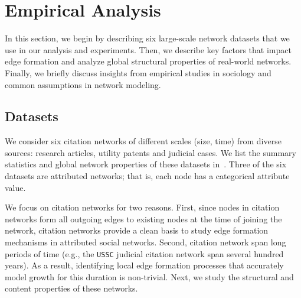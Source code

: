 
\section{Empirical Analysis}
\label{sec:Analysis}

In this section, we begin by describing six large-scale network datasets that we use in our
analysis and experiments. Then, we
describe key factors that impact edge formation and analyze global structural
properties of real-world networks. Finally, we briefly discuss insights from
empirical studies in sociology and common assumptions in network modeling.

\subsection{Datasets}
\label{sec:Datasets}

We consider six citation networks of different scales (size, time) from diverse
sources: research articles, utility patents and judicial cases. We list the
summary statistics and global network properties of these datasets in~.
Three of the six datasets are attributed networks; that is, each node has a categorical attribute value.

We focus on citation networks for two reasons. First, since nodes in citation networks form
all outgoing edges to existing nodes at the time of joining the network,
citation networks provide a clean basis to study edge formation mechanisms in
attributed social networks. Second, citation network span long periods of time (e.g.,
the \texttt{USSC} judicial citation network span several hundred years).
As a result, identifying local edge formation processes that accurately model
growth for this duration is non-trivial. Next, we study the structural and content
properties of these networks.

